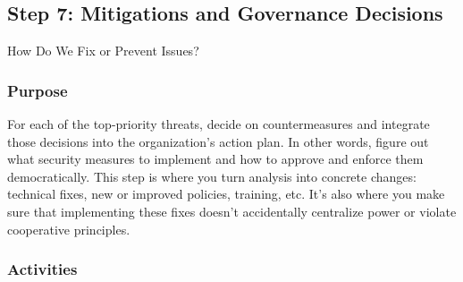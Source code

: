 \subsection{Step 7: Mitigations and Governance Decisions}
\label{subsec:Step7}

How Do We Fix or Prevent Issues?

\subsubsection{Purpose}

For each of the top-priority threats, decide on countermeasures and integrate
those decisions into the organization's action plan. In other words, figure out what
security measures to implement and how to approve and enforce them
democratically. This step is where you turn analysis into concrete changes:
technical fixes, new or improved policies, training, etc. It's also where you
make sure that implementing these fixes doesn't accidentally centralize power or
violate cooperative principles.

\subsubsection{Activities}

